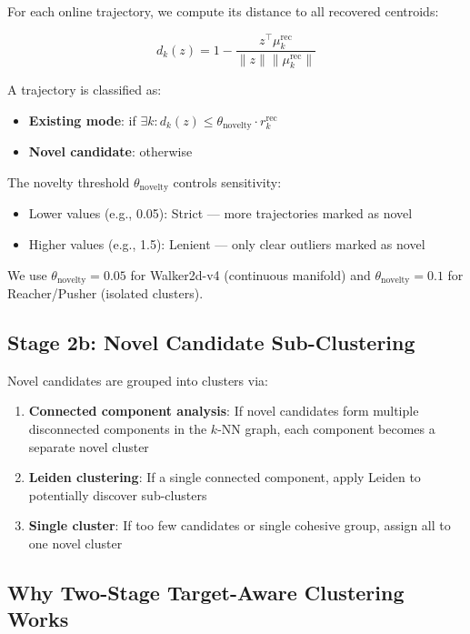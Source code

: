 \documentclass{article}
\begin{document}
For each online trajectory, we compute its distance to all recovered centroids:

\begin{equation}
    d_k(z) = 1 - \frac{z^\top \mu_k^{\text{rec}}}{\|z\| \|\mu_k^{\text{rec}}\|}
\end{equation}

A trajectory is classified as:
\begin{itemize}
    \item \textbf{Existing mode}: if $\exists k : d_k(z) \leq \theta_{\text{novelty}} \cdot r_k^{\text{rec}}$
    \item \textbf{Novel candidate}: otherwise
\end{itemize}

The novelty threshold $\theta_{\text{novelty}}$ controls sensitivity:
\begin{itemize}
    \item Lower values (e.g., 0.05): Strict — more trajectories marked as novel
    \item Higher values (e.g., 1.5): Lenient — only clear outliers marked as novel
\end{itemize}

We use $\theta_{\text{novelty}} = 0.05$ for Walker2d-v4 (continuous manifold) and $\theta_{\text{novelty}} = 0.1$ for Reacher/Pusher (isolated clusters).

\subsection{Stage 2b: Novel Candidate Sub-Clustering}

Novel candidates are grouped into clusters via:
\begin{enumerate}
    \item \textbf{Connected component analysis}: If novel candidates form multiple disconnected components in the $k$-NN graph, each component becomes a separate novel cluster
    \item \textbf{Leiden clustering}: If a single connected component, apply Leiden to potentially discover sub-clusters
    \item \textbf{Single cluster}: If too few candidates or single cohesive group, assign all to one novel cluster
\end{enumerate}

\subsection{Why Two-Stage Target-Aware Clustering Works}
\end{document}
